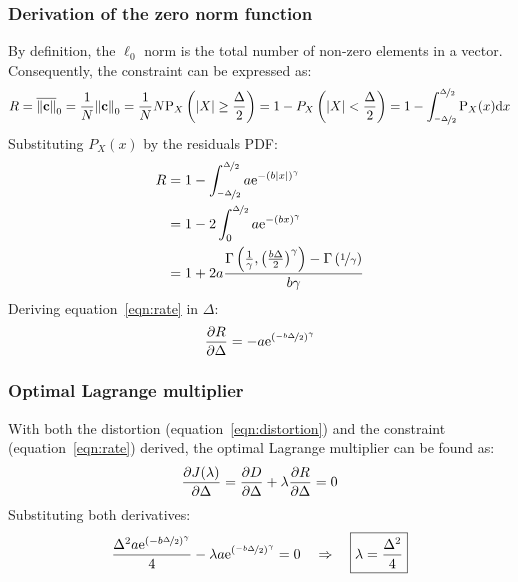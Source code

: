 \documentclass[11pt,a4paper,openright,twoside]{book}
\numberwithin{equation}{section} %
\begin{document}
\subsubsection{Derivation of the zero norm function}
\label{ssub:derivation_of_the_zero_norm_function}

By definition, the $\ell_0$ norm is the total number of non-zero
elements in a vector.
Consequently, the constraint can be expressed as:
\begin{equation}
	R 
	= \overline{\Vert \mathbf{c} \Vert}_0 = \frac{1}{N}{\Vert \mathbf{c} \Vert}_0
	= \frac{1}{N} N \text{P}_X\left(\vert X \vert \ge \frac{\Delta}{2}\right)
	= 1-P_X\left(\vert X \vert < \frac{\Delta}{2}\right)
	= 1-\int_{\nicefrac{-\Delta}{2}}^{\nicefrac{\Delta}{2}}\text{P}_X(x)\text{d} x
\end{equation}
Substituting $P_X(x)$ by the residuals \ac{PDF}:
\begin{align}
	R
	&=1-\int_{\nicefrac{-\Delta}{2}}^{\nicefrac{\Delta}{2}}
	a \text{e}^{-{\left(b\vert x \vert\right)}^\gamma} \\
	&=1-2\int_0^{\nicefrac{\Delta}{2}}
	a \text{e}^{-{\left(b x \right)}^\gamma} \\
	&=1+2a\frac{\Gamma\left(
		\frac{1}{\gamma},{\left(\frac{b\Delta}{2}\right)}^\gamma\right)-
		\Gamma\left(\nicefrac{1}{\gamma}\right)}
		{b\gamma}
	\label{eqn:rate}
\end{align}
Deriving equation~\ref{eqn:rate} in $\Delta$:
\begin{equation}
	\frac{\partial R}{\partial\Delta} =
	-a\text{e}^{{\left(\nicefrac{-b\Delta}{2}\right)}^\gamma}
\end{equation}
\subsubsection{Optimal Lagrange multiplier}
\label{ssub:optimal_lagrange_multiplier}

With both the distortion (equation~\ref{eqn:distortion}) and the
constraint (equation~\ref{eqn:rate}) derived, the optimal Lagrange
multiplier can be found as:
\begin{equation}
	\frac{\partial J(\lambda)}{\partial \Delta}
	= \frac{\partial D}{\partial \Delta} +
	\lambda \frac{\partial R}{\partial \Delta} = 0 \\
\end{equation}
Substituting both derivatives:
\begin{equation}
	\frac{\Delta^2 a \text{e}^{{(-b\nicefrac{\Delta}{2})}^\gamma}}{4}
	- \lambda
	a\text{e}^{{\left(\nicefrac{-b\Delta}{2}\right)}^\gamma} = 0
	\quad \Rightarrow \quad \boxed{\lambda = \frac{\Delta^2}{4}}
\end{equation}
\end{document}
